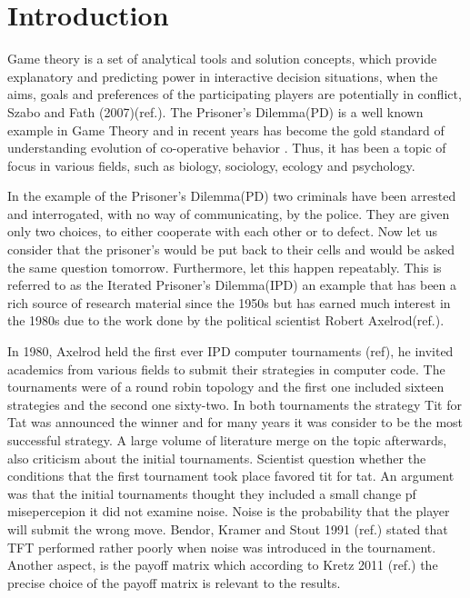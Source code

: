 \chapter{Introduction}

Game theory is a set of analytical tools and solution concepts, which provide
explanatory and predicting power in interactive decision situations, when the
aims, goals and preferences of the participating players are potentially in
conflict, Szabo and Fath (2007)(ref.). The Prisoner's Dilemma(PD) is a well
known example in Game Theory and in recent years has become the gold standard of
understanding evolution of co-operative behavior \parencite{Lorberbaum1994}. Thus, it
has been a topic of focus in various fields, such as biology, sociology, ecology
and psychology.

In the example of the Prisoner's Dilemma(PD) two criminals have been arrested
and interrogated, with no way of communicating, by the police. They are given
only two choices, to either cooperate with each other or to defect.  Now let us
consider that the prisoner's would be put back to their cells and would be asked
the same question tomorrow. Furthermore, let this happen repeatably. This is
referred to as the Iterated Prisoner's Dilemma(IPD) an example that has been a
rich source of research material since the 1950s but has earned much interest in
the 1980s due to the work done by the political scientist Robert Axelrod(ref.).

In 1980, Axelrod held the first ever IPD computer tournaments (ref), he invited
academics from various fields to submit their strategies in computer code. The
tournaments were of a round robin topology and the first one included sixteen
strategies and the second one sixty-two. In both tournaments the strategy Tit
for Tat was announced the winner and for many years it  was consider to be the
most successful strategy. A large volume of literature merge on the topic
afterwards, also criticism about the initial tournaments. Scientist question
whether the conditions that the first tournament took place favored
tit for tat. An argument was that the initial tournaments thought they included
a small change pf misepercepion it did not examine noise. Noise is the probability
that the player will submit the wrong move. Bendor, Kramer and Stout 1991 (ref.)
stated that TFT performed rather poorly when noise was introduced in the tournament.
Another aspect, is the payoff matrix which according to Kretz 2011 (ref.)
the precise choice of the payoff matrix is relevant to the results.

